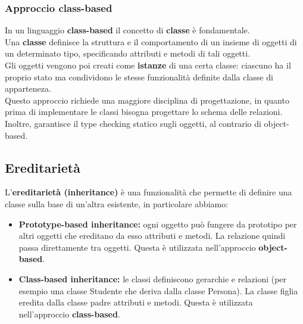 \documentclass[12pt,a4paper]{article}
\begin{document}
\subsubsection{Approccio class-based}
In un linguaggio \textbf{class-based} il concetto di \textbf{classe} è fondamentale.\\
Una \textbf{classe} definisce la struttura e il comportamento di un insieme di oggetti di un determinato tipo, specificando attributi e metodi di tali oggetti.\\
Gli oggetti vengono poi creati come \textbf{istanze} di una certa classe: ciascuno ha il proprio stato ma condividono le stesse funzionalità definite dalla classe di apparteneza.\\
Questo approccio richiede una maggiore disciplina di progettazione, in quanto prima di implementare le classi bisogna progettare lo schema delle relazioni.\\
Inoltre, garantisce il type checking statico sugli oggetti, al contrario di object-based.
\subsection{Ereditarietà}
L'\textbf{ereditarietà (inheritance)} è una funzionalità che permette di definire una classe sulla base di un'altra esistente, in particolare abbiamo:
\begin{itemize}
  \item \textbf{Prototype-based inheritance:} ogni oggetto può fungere da prototipo per altri oggetti che ereditano da esso attributi e metodi. La relazione quindi passa direttamente tra oggetti. Questa è utilizzata nell'approccio \textbf{object-based}.
  \item \textbf{Class-based inheritance:} le classi definiscono gerarchie e relazioni (per esempio una classe Studente che deriva dalla classe Persona). La classe figlia eredita dalla classe padre attributi e metodi. Questa è utilizzata nell'approccio \textbf{class-based}.
\end{itemize}
\end{document}
